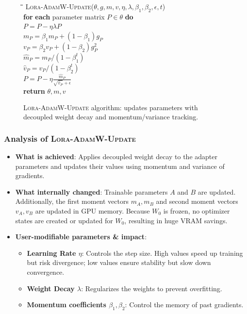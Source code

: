 \begin{figure}[h]
\centering
\begin{minipage}{0.8\linewidth}
\begin{tabbing}
\quad \= \quad \= \quad \= \quad \= \kill
\textsc{Lora-AdamW-Update}($\theta, g, m, v, \eta, \lambda, \beta_1, \beta_2, \epsilon, t$) \\
\> \textbf{for} \textbf{each} parameter matrix $P \in \theta$ \textbf{do} \\
\> \> $P = P - \eta \lambda P$ \\
\> \> $m_P = \beta_1 m_P + (1 - \beta_1) g_P$ \\
\> \> $v_P = \beta_2 v_P + (1 - \beta_2) g_P^2$ \\
\> \> $\hat{m}_P = m_P / (1 - \beta_1^t)$ \\
\> \> $\hat{v}_P = v_P / (1 - \beta_2^t)$ \\
\> \> $P = P - \eta \frac{\hat{m}_P}{\sqrt{\hat{v}_P} + \epsilon}$ \\
\> \textbf{return} $\theta, m, v$
\end{tabbing}
\end{minipage}
\caption{\textsc{Lora-AdamW-Update} algorithm: updates parameters with decoupled weight decay and momentum/variance tracking.}
\end{figure}

\subsubsection{Analysis of \textsc{Lora-AdamW-Update}}
\begin{itemize}
  \item \textbf{What is achieved}: Applies decoupled weight decay to the adapter parameters and updates their values using momentum and variance of gradients.
  \item \textbf{What internally changed}: Trainable parameters $A$ and $B$ are updated. Additionally, the first moment vectors $m_A, m_B$ and second moment vectors $v_A, v_B$ are updated in GPU memory. Because $W_0$ is frozen, no optimizer states are created or updated for $W_0$, resulting in huge VRAM savings.
  \item \textbf{User-modifiable parameters \& impact}:
    \begin{itemize}
      \item \textbf{Learning Rate $\eta$}: Controls the step size. High values speed up training but risk divergence; low values ensure stability but slow down convergence.
      \item \textbf{Weight Decay $\lambda$}: Regularizes the weights to prevent overfitting.
      \item \textbf{Momentum coefficients $\beta_1, \beta_2$}: Control the memory of past gradients.
    \end{itemize}
\end{itemize}


